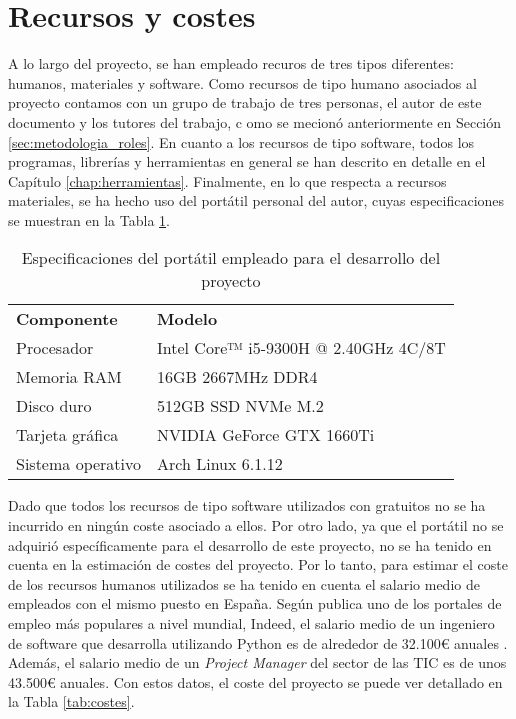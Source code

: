 \section{Recursos y costes}
\label{sec:planificacion_costes}

A lo largo del proyecto, se han empleado recuros de tres tipos diferentes: humanos, materiales y software.
Como recursos de tipo humano asociados al proyecto
contamos con un grupo de trabajo de tres personas, el autor de este documento y los tutores del trabajo, c
omo se mecionó anteriormente en Sección \ref{sec:metodologia_roles}.
En cuanto a los recursos de tipo software, todos los programas, librerías y herramientas en general
se han descrito en detalle en el Capítulo \ref{chap:herramientas}.
Finalmente, en lo que respecta a recursos materiales, se ha hecho uso del portátil personal del autor, 
cuyas especificaciones se muestran en la Tabla \ref{tab:costes_hardware}.

\begin{table}[H]
	\centering
	\begin{tabular}{l|l}
		\rowcolor{udcpink!25}
		\textbf{Componente} & \textbf{Modelo} \\
		Procesador & Intel Core™ i5-9300H @ 2.40GHz 4C/8T \\
		Memoria RAM & 16GB 2667MHz DDR4 \\
		Disco duro & 512GB SSD NVMe M.2 \\
		Tarjeta gráfica & NVIDIA GeForce GTX 1660Ti \\
		Sistema operativo & Arch Linux 6.1.12 \\
	\end{tabular}
	\caption{Especificaciones del portátil empleado para el desarrollo del proyecto}
	\label{tab:costes_hardware}
\end{table}

Dado que todos los recursos de tipo software utilizados con gratuitos no se ha incurrido en ningún coste
asociado a ellos. Por otro lado, ya que el portátil no se adquirió específicamente para el desarrollo de este proyecto,
no se ha tenido en cuenta en la estimación de costes del proyecto. Por lo tanto, para estimar el coste de los recursos
humanos utilizados se ha tenido en cuenta el salario medio de empleados con el mismo puesto en España. Según publica
uno de los portales de empleo más populares a nivel mundial, Indeed, el salario medio de un ingeniero de software que desarrolla
utilizando Python es de alrededor de 32.100€ anuales \cite{indeedsalario}. Además, el salario medio de un \textit{Project Manager}
del sector de las TIC es de unos 43.500€ anuales. Con estos datos, el coste del proyecto se puede ver detallado en la Tabla \ref{tab:costes}.

